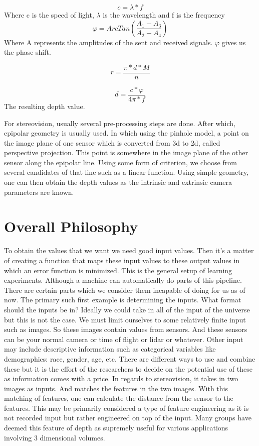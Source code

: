 \begin{equation}
c = \lambda * f
\end{equation}
Where c is the speed of light, $\lambda$ is the wavelength and f is the frequency
\begin{equation}
	\varphi = ArcTan(\frac{A_1 - A_3}{A_2 - A_4})
\end{equation}
Where A represents the amplitudes of the sent and received signals. $\varphi$ gives us the phase shift.

\begin{equation}
	r = \frac{\pi * d * M}{n}
\end{equation}

\begin{equation}
	d = \frac{c * \varphi}{4\pi * f}
\end{equation}
The resulting depth value.

For stereovision, usually several pre-processing steps are done. After which, epipolar geometry is usually used. In which using the pinhole model, a point on the image plane of one sensor which is converted from 3d to 2d, called perspective projection. This point is somewhere in the image plane of the other sensor along the epipolar line. Using some form of criterion, we choose from several candidates of that line such as a linear function. Using simple geometry, one can then obtain the depth values as the intrinsic and extrinsic camera parameters are known.
\section{Overall Philosophy}
To obtain the values that we want we need good input values. Then it's a matter of creating a function that maps these input values to these output values in which an error function is minimized. 
This is the general setup of learning experiments. Although a machine can automatically do parts of this pipeline. There are certain parts which we consider them incapable of doing for us as of now. The primary such first example is determining the inputs. What format should the inputs be in? Ideally we could take in all of the input of the universe but this is not the case. We must limit ourselves to some relatively finite input such as images. So these images contain values from sensors. And these sensors can be your normal camera or time of flight or lidar or whatever. Other input may include descriptive information such as categorical variables like demographics: race, gender, age, etc. There are different ways to use and combine these but it is the effort of the researchers to decide on the potential use of these as information comes with a price. In regards to stereovision, it takes in two images as inputs. And matches the features in the two images. With this matching of features, one can calculate the distance from the sensor to the features. This may be primarily considered a type of feature engineering as it is not recorded input but rather engineered on top of the input. Many groups have deemed this feature of depth as supremely useful for various applications involving 3 dimensional volumes.

